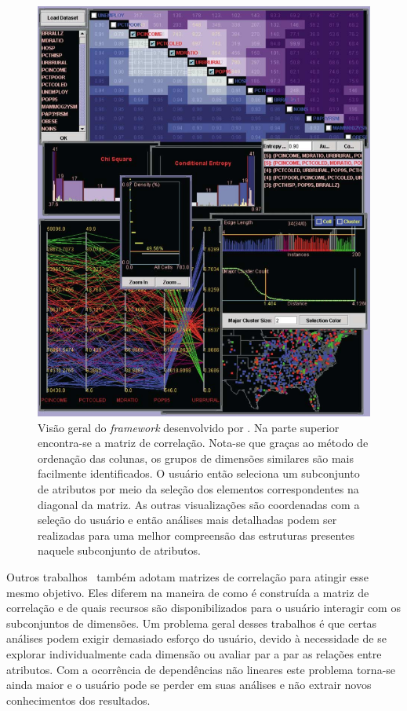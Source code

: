 \begin{figure}[h!]
    \centering
    \includegraphics[width=12cm]{images/coord.png}
    \caption[\cite{Guo2003}]{Visão geral do \emph{framework} desenvolvido por \cite{Guo2003}. Na parte superior encontra-se a matriz de correlação. Nota-se que graças ao método de ordenação das colunas, os grupos de dimensões similares são mais facilmente identificados. O usuário então seleciona um subconjunto de atributos por meio da seleção dos elementos correspondentes na diagonal da matriz. As outras visualizações são coordenadas com a seleção do usuário e então análises mais detalhadas podem ser realizadas para uma melhor compreensão das estruturas presentes naquele subconjunto de atributos.} 
    \label{fig:coord}
\end{figure}

Outros trabalhos~\cite{RFriendly2002,BF2004,MacEachren2003,May2011,May2011ss} também adotam matrizes de correlação para atingir esse mesmo objetivo. Eles diferem na maneira de como é construída a matriz de correlação e de quais recursos são disponibilizados para o usuário interagir com os subconjuntos de dimensões. Um problema geral desses trabalhos é que certas análises podem exigir demasiado esforço do usuário, devido à necessidade de se explorar individualmente cada dimensão ou avaliar par a par as relações entre atributos. Com a ocorrência de dependências não lineares este problema torna-se ainda maior e o usuário pode se perder em suas análises e não extrair novos conhecimentos dos resultados. 

